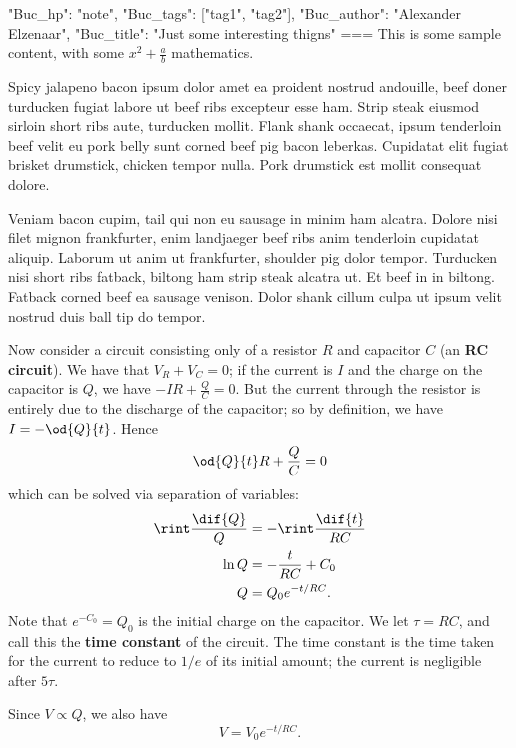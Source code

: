 {"Buc_hp": "note",
 "Buc_tags": ["tag1", "tag2"],
 "Buc_author": "Alexander Elzenaar",
 "Buc_title": "Just some interesting thigns"}
===
This is some sample content, with some $ x^2 + \frac{a}{b} $ mathematics.

Spicy jalapeno bacon ipsum dolor amet ea proident nostrud andouille, beef doner turducken fugiat labore ut beef ribs excepteur esse ham. Strip steak eiusmod sirloin short ribs aute, turducken mollit. Flank shank occaecat, ipsum tenderloin beef velit eu pork belly sunt corned beef pig bacon leberkas. Cupidatat elit fugiat brisket drumstick, chicken tempor nulla. Pork drumstick est mollit consequat dolore.

Veniam bacon cupim, tail qui non eu sausage in minim ham alcatra. Dolore nisi filet mignon frankfurter, enim landjaeger beef ribs anim tenderloin cupidatat aliquip. Laborum ut anim ut frankfurter, shoulder pig dolor tempor. Turducken nisi short ribs fatback, biltong ham strip steak alcatra ut. Et beef in in biltong. Fatback corned beef ea sausage venison. Dolor shank cillum culpa ut ipsum velit nostrud duis ball tip do tempor.

Now consider a circuit consisting only of a resistor $ R $ and capacitor $ C $ (an \textbf{RC circuit}). We have that $ V_R + V_C = 0 $;
if the current is $ I $ and the charge on the capacitor is $ Q $, we have $ -IR + \frac{Q}{C} = 0 $.
But the current through the resistor is entirely due to the discharge of the capacitor; so by definition,
we have $ I = -\od{Q}{t} $. Hence
\begin{displaymath}
  \od{Q}{t} R + \frac{Q}{C} = 0
\end{displaymath}
which can be solved via separation of variables:
\begin{align}
  \rint \frac{\dif{Q}}{Q} &= -\rint \frac{\dif{t}}{RC}\nonumber\\
  \ln Q &= -\frac{t}{RC} + C_0\nonumber\\
  Q &= Q_0 e^{-t/RC}.
\end{align}
Note that $ e^{-C_0} = Q_0 $ is the initial charge on the capacitor. We let $ \tau = RC $, and call this the
\textbf{time constant} of the circuit. The time constant is the time taken for the current to reduce to $ 1/e $
of its initial amount; the current is negligible after $ 5\tau $.

Since $ V \propto Q $, we also have
\begin{equation}
  V = V_0 e^{-t/RC}.
\end{equation}

